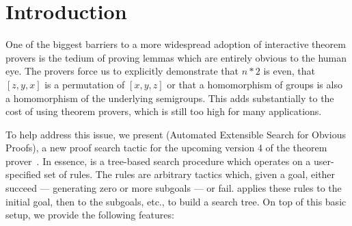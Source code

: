\section{Introduction}

One of the biggest barriers to a more widespread adoption of interactive theorem
provers is the tedium of proving lemmas which are entirely obvious to the human
eye. The provers force us to explicitly demonstrate that $n * 2$ is even, that
$[z, y, x]$ is a permutation of $[x, y, z]$ or that a homomorphism of groups is
also a homomorphism of the underlying semigroups. This adds substantially to the
cost of using theorem provers, which is still too high for many applications.

To help address this issue, we present \Aesop{} (Automated Extensible Search for
Obvious Proofs), a new proof search tactic for the upcoming version 4 of the
\Lean{} theorem prover~\cite{Lean4}. In essence, \Aesop{} is a tree-based search
procedure which operates on a user-specified set of rules. The rules are
arbitrary \Lean{} tactics which, given a goal, either succeed --- generating
zero or more subgoals --- or fail. \Aesop{} applies these rules to the initial
goal, then to the subgoals, etc., to build a search tree. On top of this basic
setup, we provide the following features:
